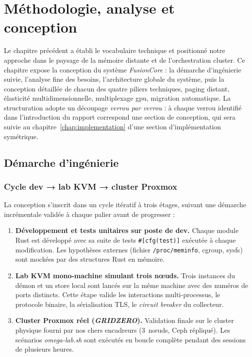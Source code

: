 \chapter{Méthodologie, analyse et conception}
\label{chap:conception}


Le chapitre précédent a établi le vocabulaire technique et positionné notre approche dans le paysage de la mémoire distante et de l'orchestration cluster. Ce chapitre expose la conception du système \emph{FusionCore} : la démarche d'ingénierie suivie, l'analyse fine des besoins, l'architecture globale du système, puis la conception détaillée de chacun des quatre piliers techniques, paging distant, élasticité multidimensionnelle, multiplexage \acrshort{gpu}, migration automatique. La structuration adopte un découpage \emph{verrou par verrou} : à chaque verrou identifié dans l'introduction du rapport correspond une section de conception, qui sera suivie au chapitre~\ref{chap:implementation} d'une section d'implémentation symétrique.

\section{Démarche d'ingénierie}
\label{sec:demarche}

\subsection{Cycle dev → lab KVM → cluster Proxmox}

La conception s'inscrit dans un cycle itératif à trois étages, suivant une démarche incrémentale validée à chaque palier avant de progresser :

\begin{enumerate}[leftmargin=*]
    \item \textbf{Développement et tests unitaires sur poste de dev.} Chaque module Rust est développé avec sa suite de tests \texttt{\#[cfg(test)]} exécutée à chaque modification. Les hypothèses externes (fichier \texttt{/proc/meminfo}, cgroup, sysfs) sont mockées par des structures Rust en mémoire.
    \item \textbf{Lab KVM mono-machine simulant trois nœuds.} Trois instances du démon et un store local sont lancés sur la même machine avec des numéros de ports distincts. Cette étape valide les interactions multi-processus, le protocole binaire, la sérialisation TLS, le \emph{circuit breaker} du collecteur.
    \item \textbf{Cluster Proxmox réel (\emph{GRIDZERO}).} Validation finale sur le cluster physique fourni par nos chers encadreurs (3~nœuds, Ceph répliqué). Les scénarios \emph{omega-lab.sh} sont exécutés en boucle complète pendant des sessions de plusieurs heures.
\end{enumerate}

